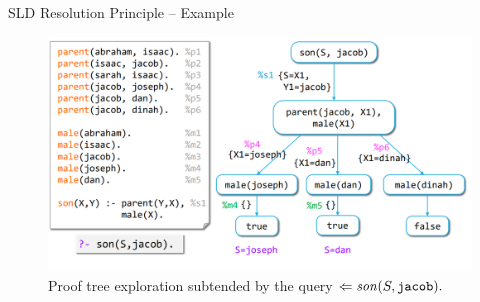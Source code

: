 \documentclass[presentation]{beamer}\mode<presentation>{\usetheme{AMSBolognaFC}}
\begin{document}
\begin{frame}[allowframebreaks]{SLD Resolution Principle -- Example}
    \begin{figure}
        \includegraphics[width=\linewidth]{figures/proof-tree.png}
        \caption{Proof tree exploration subtended by the query $\Leftarrow \text{\textit{son}}(S, \mathtt{jacob}) \mathtt{.}$}
    \end{figure}
\end{frame}
\end{document}
